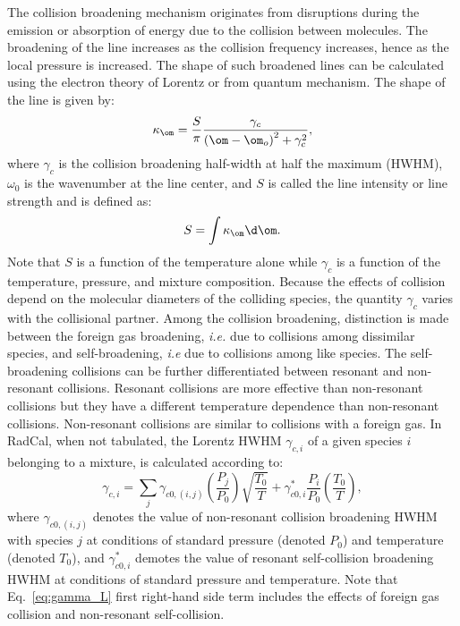 The collision broadening mechanism originates from disruptions during the emission or absorption of energy due to the collision between molecules. The broadening of the line increases as the collision frequency increases, hence as the local pressure is increased. The shape of such broadened lines can be calculated using the electron theory of Lorentz or from quantum mechanism. The shape of the line is given by:
\begin{equation}\label{eq:lorentz_line}
 \kappa_{\om} = \dfrac{S}{\pi}\dfrac{\gamma_c}{\left( \om - \om_o\right)^2 + \gamma_c^2},
\end{equation}
where $\gamma_c$ is the collision broadening half-width at half the maximum (HWHM), $\omega_0$ is the wavenumber at the line center, and $S$ is called the line intensity or line strength and is defined as:
\begin{equation}
 S = \displaystyle\int{\kappa_{\om} \d \om}.
\end{equation}
Note that $S$ is a function of the temperature alone while $\gamma_c$ is a function of the temperature, pressure, and mixture composition. Because the effects of collision depend on the molecular diameters of the colliding species, the quantity $\gamma_c$ varies with the collisional partner. Among the collision broadening, distinction is made between the foreign gas broadening, \textit{i.e.} due to collisions among dissimilar species, and self-broadening, \textit{i.e} due to collisions among like species. The self-broadening collisions can be further differentiated between resonant and non-resonant collisions. Resonant collisions are more effective than non-resonant collisions but they have a different temperature dependence than non-resonant collisions. Non-resonant collisions are similar to collisions with a foreign gas. In RadCal, when not tabulated, the Lorentz HWHM $\gamma_{c,i}$ of a given species $i$ belonging to a mixture, is calculated according to:
\begin{equation}\label{eq:gamma_L}
 \gamma_{c,i} = \displaystyle\sum_{j} \gamma_{c0,(i,j)} \left(\dfrac{P_j}{P_0}\right)\displaystyle\sqrt{\dfrac{T_0}{T}} + \gamma^*_{c0,i}\dfrac{P_i}{P_0}\left(\dfrac{T_0}{T}\right),
\end{equation}
where $\gamma_{c0,(i,j)}$ denotes the value of non-resonant collision broadening HWHM with species $j$ at conditions of standard pressure (denoted $P_0$) and temperature (denoted $T_0$), and $\gamma^*_{c0,i}$ demotes the value of resonant self-collision broadening HWHM at conditions of standard pressure and temperature. Note that Eq.~\ref{eq:gamma_L} first right-hand side term includes the effects of foreign gas collision and non-resonant self-collision.

